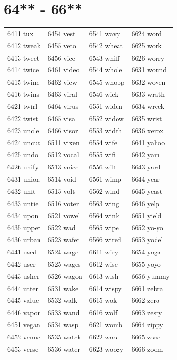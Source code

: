 \documentclass[12pt, oneside]{book}
\begin{document}
	\begin{table}[h]
		\centering
		\section*{64** - 66**}
		\begin{tabular}{l l l l}
			6411 tux & 6454 vest & 6541 wavy & 6624 word\\
			6412 tweak & 6455 veto & 6542 wheat & 6625 work\\
			6413 tweet & 6456 vice & 6543 whiff & 6626 worry\\
			6414 twice & 6461 video & 6544 whole & 6631 wound\\
			6415 twine & 6462 view & 6545 whoop & 6632 woven\\
			6416 twins & 6463 viral & 6546 wick & 6633 wrath\\
			6421 twirl & 6464 virus & 6551 widen & 6634 wreck\\
			6422 twist & 6465 visa & 6552 widow & 6635 wrist\\
			6423 uncle & 6466 visor & 6553 width & 6636 xerox\\
			6424 uncut & 6511 vixen & 6554 wife & 6641 yahoo\\
			6425 undo & 6512 vocal & 6555 wifi & 6642 yam\\
			6426 unify & 6513 voice & 6556 wilt & 6643 yard\\
			6431 union & 6514 void & 6561 wimp & 6644 year\\
			6432 unit & 6515 volt & 6562 wind & 6645 yeast\\
			6433 untie & 6516 voter & 6563 wing & 6646 yelp\\
			6434 upon & 6521 vowel & 6564 wink & 6651 yield\\
			6435 upper & 6522 wad & 6565 wipe & 6652 yo-yo\\
			6436 urban & 6523 wafer & 6566 wired & 6653 yodel\\
			6441 used & 6524 wager & 6611 wiry & 6654 yoga\\
			6442 user & 6525 wages & 6612 wise & 6655 yoyo\\
			6443 usher & 6526 wagon & 6613 wish & 6656 yummy\\
			6444 utter & 6531 wake & 6614 wispy & 6661 zebra\\
			6445 value & 6532 walk & 6615 wok & 6662 zero\\
			6446 vapor & 6533 wand & 6616 wolf & 6663 zesty\\
			6451 vegan & 6534 wasp & 6621 womb & 6664 zippy\\
			6452 venue & 6535 watch & 6622 wool & 6665 zone\\
			6453 verse & 6536 water & 6623 woozy & 6666 zoom\\
			
		\end{tabular}
	\end{table}
	\pagebreak
	\backmatter
\end{document}
